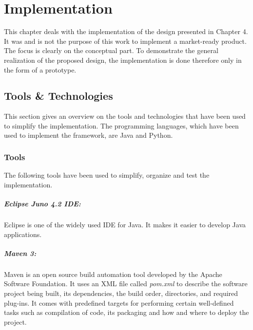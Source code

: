 \chapter{Implementation\label{cha:chapter5}}
This chapter deals with the implementation of the design presented in Chapter 4. It was and is not the purpose of this work to implement a market-ready product. The focus is clearly on the conceptual part. To demonstrate the general realization of the proposed design, the implementation is done therefore only in the form of a prototype.



\section{Tools \& Technologies\label{sec:impl_tools_tech}}	
This section gives an overview on the tools and technologies that have been used to simplify the implementation. The programming languages, which have been used to implement the framework, are Java and Python.

\subsection{Tools\label{sec:impl_tools}}
The following tools have been used to simplify, organize and test the implementation.

\paragraph{Eclipse Juno 4.2 IDE:\label{sec:impl_eclipse}} Eclipse is one of the widely used IDE for Java. It makes it easier to develop Java applications. 

\paragraph{Maven 3:\label{sec:impl_maven}} Maven is an open source build automation tool developed by the Apache Software Foundation. It uses an XML file called \textit{pom.xml} to describe the software project being built, its dependencies, the build order, directories, and required plug-ins. It comes with predefined targets for performing certain well-defined tasks such as compilation of code, its packaging and how and where to deploy the project.


